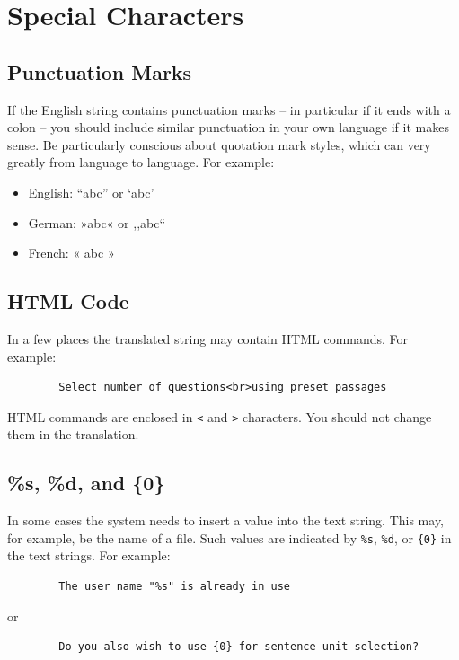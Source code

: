 \documentclass[11pt,oneside,a4paper]{memoir}
\begin{document}
\section{Special Characters}

\subsection{Punctuation Marks}

If the English string contains punctuation marks -- in particular if it ends with a colon -- you should
include similar punctuation in your own language if it makes sense. Be particularly conscious about
quotation mark styles, which can very greatly from language to language. For example:

\begin{itemize}
\item[] English: ``abc'' or `abc'
\item[] German: »abc« or ,,abc``
\item[] French: « abc »
\end{itemize}


\subsection{HTML Code}

In a few places the translated string may contain HTML commands. For example:

\begin{verbatim}
        Select number of questions<br>using preset passages
\end{verbatim}

HTML commands are enclosed in \verb|<| and \verb|>| characters. You should not change them in the
translation.

\subsection{\%s, \%d, and \{0\}}

In some cases the system needs to insert a value into the text string. This may, for example, be the
name of a file. Such values are indicated by \verb|%s|, \verb|%d|, or \verb|{0}| in the text
strings. For example:

\begin{verbatim}
        The user name "%s" is already in use
\end{verbatim}

\noindent or
\begin{verbatim}
        Do you also wish to use {0} for sentence unit selection?
\end{verbatim}
\end{document}
